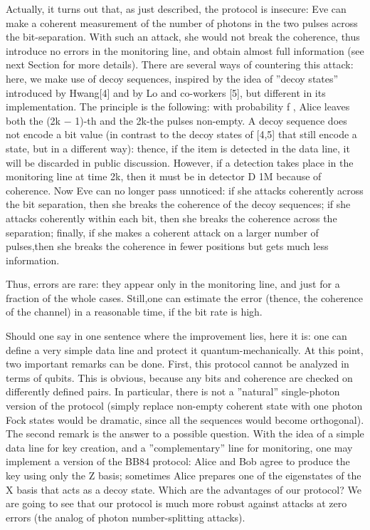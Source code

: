 Actually, it turns out that, as just described, the protocol is insecure: Eve can make a coherent measurement of the number of photons in the two pulses across the bit-separation. With such an attack, she would not break the coherence, thus introduce no errors in the monitoring line, and obtain almost full information (see next Section for more details). There are several ways of countering this attack: here, we make use of decoy sequences, inspired by the idea of ”decoy states” introduced by Hwang[4] and by Lo and co-workers [5], but different in its implementation. The principle is the following: with probability f , Alice leaves both the (2k − 1)-th and the 2k-the pulses non-empty. A decoy sequence does not encode a bit value (in contrast to the decoy states of [4,5] that still encode a state, but in a different way): thence, if the item is detected in the data line, it will be discarded in public discussion. However, if a detection takes place in the monitoring line at time 2k, then it must be in detector D 1M because of coherence. Now Eve can no longer pass unnoticed: if she attacks coherently across the bit separation, then she breaks the coherence of the decoy sequences; if she attacks coherently within each bit, then she breaks the coherence across the separation; finally, if she makes a coherent attack on a larger number of pulses,then she breaks the coherence in fewer positions but gets much less information.

Thus, errors are rare: they appear only in the monitoring line, and just for a fraction of the whole cases. Still,one can estimate the error (thence, the coherence of the channel) in a reasonable time, if the bit rate is high.

Should one say in one sentence where the improvement lies, here it is: one can define a very simple data line and protect it quantum-mechanically. At this point, two important remarks can be done. First, this protocol cannot be analyzed in terms of qubits. This is obvious, because any bits and coherence are checked on differently defined pairs. In particular, there is not a ”natural” single-photon version of the protocol (simply replace non-empty coherent state with one photon Fock states would be dramatic, since all the sequences would become orthogonal). The second remark is the answer to a possible question. With the idea of a simple data line for key creation, and a ”complementary” line for monitoring, one may implement a version of the BB84 protocol: Alice and Bob agree to produce the key using only the Z basis; sometimes Alice prepares one of the eigenstates of the X basis that acts as a decoy state. Which are the advantages of our protocol? We are going to see that our protocol is much more robust against attacks at zero errors (the analog of photon number-splitting attacks).

